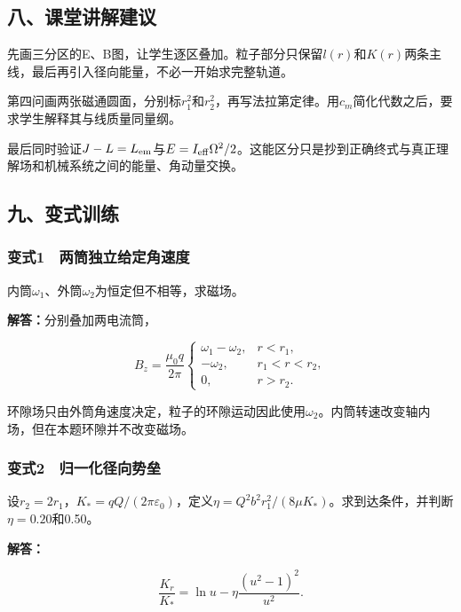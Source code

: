 \documentclass[12pt,a4paper,fontset=fandol]{ctexart}
\begin{document}
\subsection{八、课堂讲解建议}\label{ux516bux8bfeux5802ux8bb2ux89e3ux5efaux8bae-5}

先画三分区的E、B图，让学生逐区叠加。粒子部分只保留\(l(r)\)和\(K(r)\)两条主线，最后再引入径向能量，不必一开始求完整轨道。

第四问画两张磁通圆面，分别标\(r_1^2\)和\(r_2^2\)，再写法拉第定律。用\(c_m\)简化代数之后，要求学生解释其与线质量同量纲。

最后同时验证\(J-L=L_{\rm em}\)与\(E=I_{\rm eff}\Omega^2/2\)。这能区分只是抄到正确终式与真正理解场和机械系统之间的能量、角动量交换。

\subsection{九、变式训练}\label{ux4e5dux53d8ux5f0fux8badux7ec3-5}

\subsubsection{变式1　两筒独立给定角速度}\label{ux53d8ux5f0f1-ux4e24ux7b52ux72ecux7acbux7ed9ux5b9aux89d2ux901fux5ea6}

内筒\(\omega_1\)、外筒\(\omega_2\)为恒定但不相等，求磁场。

\textbf{解答：}分别叠加两电流筒，

\[
B_z=\frac{\mu_0q}{2\pi}
\begin{cases}
\omega_1-\omega_2,&r<r_1,\\
-\omega_2,&r_1<r<r_2,\\
0,&r>r_2.
\end{cases}
\]

环隙场只由外筒角速度决定，粒子的环隙运动因此使用\(\omega_2\)。内筒转速改变轴内场，但在本题环隙并不改变磁场。

\subsubsection{变式2　归一化径向势垒}\label{ux53d8ux5f0f2-ux5f52ux4e00ux5316ux5f84ux5411ux52bfux5792}

设\(r_2=2r_1\)，\(K_*=qQ/(2\pi\varepsilon_0)\)，定义\(\eta=Q^2b^2r_1^2/(8\mu K_*)\)。求到达条件，并判断\(\eta=0.20\)和0.50。

\textbf{解答：}

\[
\frac{K_r}{K_*}=\ln u-\eta\frac{(u^2-1)^2}{u^2}.
\]
\end{document}
